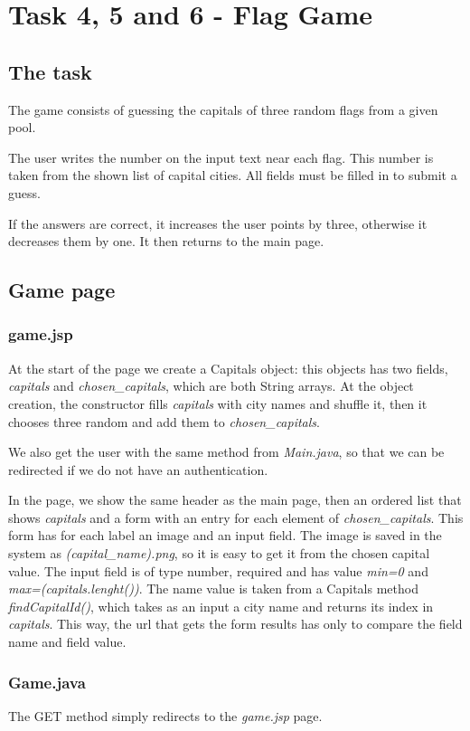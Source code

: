 \section{Task 4, 5 and 6 - Flag Game}
\subsection{The task}
The game consists of guessing the capitals of three random flags from a given pool.

The user writes the number on the input text near each flag. This number is taken from the shown list of capital cities. All fields must be filled in to submit a guess.

If the answers are correct, it increases the user points by three, otherwise it decreases them by one. It then returns to the main page.
\subsection{Game page}
\subsubsection{game.jsp}
At the start of the page we create a Capitals object: this objects has two fields, \textit{capitals} and \textit{chosen\_capitals}, which are both String arrays. At the object creation, the constructor fills \textit{capitals} with city names and shuffle it, then it chooses three random and add them to \textit{chosen\_capitals}.

We also get the user with the same method from \textit{Main.java}, so that we can be redirected if we do not have an authentication.

In the page, we show the same header as the main page, then an ordered list that shows \textit{capitals} and a form with an entry for each element of \textit{chosen\_capitals}. This form has for each label an image and an input field. The image is saved in the system as \textit{(capital\_name).png}, so it is easy to get it from the chosen capital value. The input field is of type number, required and has value \textit{min=0} and \textit{max=(capitals.lenght())}. The name value is taken from a Capitals method \textit{findCapitalId()}, which takes as an input a city name and returns its index in \textit{capitals}. This way, the url that gets the form results has only to compare the field name and field value.
\subsubsection{Game.java}
The GET method simply redirects to the \textit{game.jsp} page.

